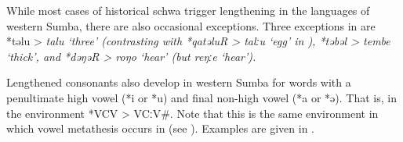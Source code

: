 While most cases of historical schwa trigger lengthening in the
languages of western Sumba,
there are also occasional exceptions.
Three exceptions in  are *təlu > \it{talu} ‘three’ (contrasting
with *qatəluR > \it{talːu} ‘egg’ in ),
*təbəl > \it{tembe} ‘thick’,
and *dəŋəR > \it{roŋo} ‘hear’ (but  \it{reŋːe} ‘hear’).

Lengthened consonants also develop in western Sumba
for words with a penultimate high vowel
(*i or *u) and final non-high vowel (*a or *ə).
That is, in the environment *V\tsc{[+high]}CV\tsc{[-low]}{\#} > VCːV{\#}.
Note that this is the same environment in which vowel metathesis
occurs in  (see  ).
Examples are given in .

